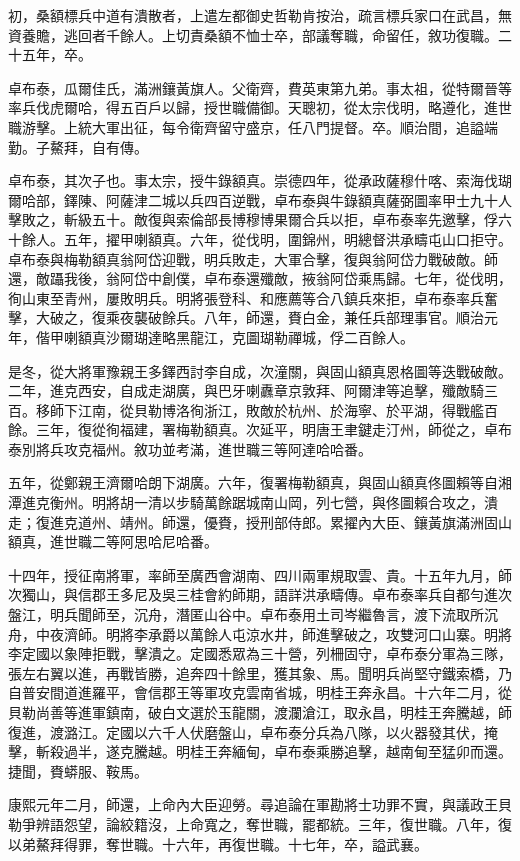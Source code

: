 \begin{pinyinscope}
初，桑額標兵中道有潰散者，上遣左都御史哲勒肯按治，疏言標兵家口在武昌，無資養贍，逃回者千餘人。上切責桑額不恤士卒，部議奪職，命留任，敘功復職。二十五年，卒。

卓布泰，瓜爾佳氏，滿洲鑲黃旗人。父衛齊，費英東第九弟。事太祖，從特爾晉等率兵伐虎爾哈，得五百戶以歸，授世職備御。天聰初，從太宗伐明，略遵化，進世職游擊。上統大軍出征，每令衛齊留守盛京，任八門提督。卒。順治間，追謚端勤。子鰲拜，自有傳。

卓布泰，其次子也。事太宗，授牛錄額真。崇德四年，從承政薩穆什喀、索海伐瑚爾哈部，鐸陳、阿薩津二城以兵四百逆戰，卓布泰與牛錄額真薩弼圖率甲士九十人擊敗之，斬級五十。敵復與索倫部長博穆博果爾合兵以拒，卓布泰率先邀擊，俘六十餘人。五年，擢甲喇額真。六年，從伐明，圍錦州，明總督洪承疇屯山口拒守。卓布泰與梅勒額真翁阿岱迎戰，明兵敗走，大軍合擊，復與翁阿岱力戰破敵。師還，敵躡我後，翁阿岱中創僕，卓布泰還殲敵，掖翁阿岱乘馬歸。七年，從伐明，徇山東至青州，屢敗明兵。明將張登科、和應薦等合八鎮兵來拒，卓布泰率兵奮擊，大破之，復乘夜襲破餘兵。八年，師還，賚白金，兼任兵部理事官。順治元年，偕甲喇額真沙爾瑚達略黑龍江，克圖瑚勒禪城，俘二百餘人。

是冬，從大將軍豫親王多鐸西討李自成，次潼關，與固山額真恩格圖等迭戰破敵。二年，進克西安，自成走湖廣，與巴牙喇纛章京敦拜、阿爾津等追擊，殲敵騎三百。移師下江南，從貝勒博洛徇浙江，敗敵於杭州、於海寧、於平湖，得戰艦百餘。三年，復從徇福建，署梅勒額真。次延平，明唐王聿鍵走汀州，師從之，卓布泰別將兵攻克福州。敘功並考滿，進世職三等阿達哈哈番。

五年，從鄭親王濟爾哈朗下湖廣。六年，復署梅勒額真，與固山額真佟圖賴等自湘潭進克衡州。明將胡一清以步騎萬餘踞城南山岡，列七營，與佟圖賴合攻之，潰走；復進克道州、靖州。師還，優賚，授刑部侍郎。累擢內大臣、鑲黃旗滿洲固山額真，進世職二等阿思哈尼哈番。

十四年，授征南將軍，率師至廣西會湖南、四川兩軍規取雲、貴。十五年九月，師次獨山，與信郡王多尼及吳三桂會約師期，語詳洪承疇傳。卓布泰率兵自都勻進次盤江，明兵聞師至，沉舟，潛匿山谷中。卓布泰用土司岑繼魯言，渡下流取所沉舟，中夜濟師。明將李承爵以萬餘人屯涼水井，師進擊破之，攻雙河口山寨。明將李定國以象陣拒戰，擊潰之。定國悉眾為三十營，列柵固守，卓布泰分軍為三隊，張左右翼以進，再戰皆勝，追奔四十餘里，獲其象、馬。聞明兵尚堅守鐵索橋，乃自普安間道進羅平，會信郡王等軍攻克雲南省城，明桂王奔永昌。十六年二月，從貝勒尚善等進軍鎮南，破白文選於玉龍關，渡瀾滄江，取永昌，明桂王奔騰越，師復進，渡潞江。定國以六千人伏磨盤山，卓布泰分兵為八隊，以火器發其伏，掩擊，斬殺過半，遂克騰越。明桂王奔緬甸，卓布泰乘勝追擊，越南甸至猛卯而還。捷聞，賚蟒服、鞍馬。

康熙元年二月，師還，上命內大臣迎勞。尋追論在軍勘將士功罪不實，與議政王貝勒爭辨語怨望，論絞籍沒，上命寬之，奪世職，罷都統。三年，復世職。八年，復以弟鰲拜得罪，奪世職。十六年，再復世職。十七年，卒，謚武襄。


\end{pinyinscope}
